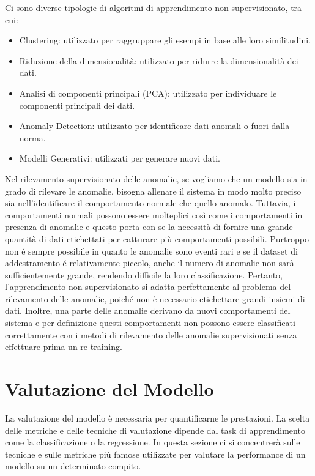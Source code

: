 Ci sono diverse tipologie di algoritmi di apprendimento non supervisionato, tra cui:
\begin{itemize}
\item Clustering: utilizzato per raggruppare gli esempi in base alle loro similitudini.
\item Riduzione della dimensionalità: utilizzato per ridurre la dimensionalità dei dati.
\item Analisi di componenti principali (PCA): utilizzato per individuare le componenti principali dei dati.
\item Anomaly Detection: utilizzato per identificare dati anomali o fuori dalla norma.
\item Modelli Generativi: utilizzati per generare nuovi dati.


\end{itemize}
Nel rilevamento supervisionato delle anomalie, se vogliamo che un modello sia in grado di rilevare le anomalie, bisogna allenare il sistema in modo molto preciso sia nell'identificare il comportamento normale che quello anomalo.
Tuttavia, i comportamenti normali possono essere molteplici così come i
comportamenti in presenza di anomalie e questo porta con se la necessità di fornire una grande quantità di dati etichettati per catturare più comportamenti possibili. Purtroppo non é sempre possibile in quanto le anomalie sono eventi rari e se il dataset di addestramento é relativamente piccolo, anche il numero di anomalie non sarà sufficientemente grande, rendendo difficile la loro classificazione. 
Pertanto, l'apprendimento non supervisionato si adatta perfettamente al problema del rilevamento delle anomalie, poiché non è necessario etichettare grandi insiemi di dati. Inoltre, una parte delle anomalie derivano da nuovi comportamenti del sistema e per definizione questi comportamenti non possono essere classificati correttamente con i metodi di rilevamento delle anomalie supervisionati senza effettuare prima un re-training.


\section{Valutazione del Modello}
La valutazione del modello è necessaria per quantificarne le prestazioni. La
scelta delle metriche e delle tecniche di valutazione dipende dal task di apprendimento come la classificazione o la regressione. 
In questa sezione ci si concentrerà sulle tecniche e sulle metriche più famose utilizzate per valutare la performance di un modello su un determinato compito.

